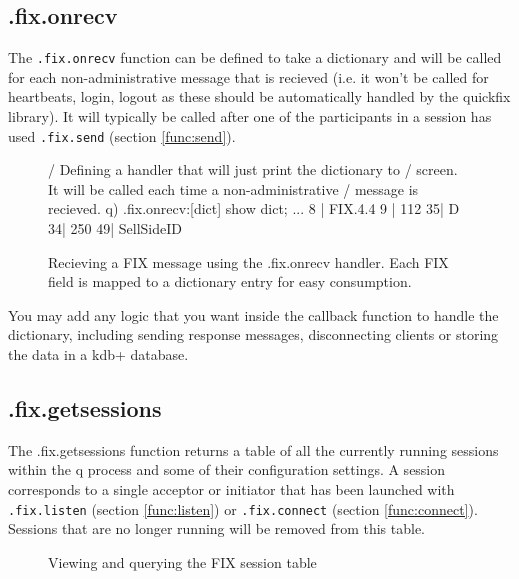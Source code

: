 \subsection{.fix.onrecv}
\label{func:onrecv}

The \texttt{.fix.onrecv} function can be defined to take a dictionary and will be called for each non-administrative message that is recieved (i.e. it won't be called for heartbeats, login, logout as these should be automatically handled by the quickfix library). It will typically be called after one of the participants in a session has used \texttt{.fix.send} (section \ref{func:send}). 

\begin{figure}[H]
\begin{qcode}
/ Defining a handler that will just print the dictionary to
/ screen. It will be called each time a non-administrative
/ message is recieved.
q) .fix.onrecv:{[dict] show dict; }
...
8 | FIX.4.4
9 | 112
35| D
34| 250
49| SellSideID
\end{qcode}
\caption{Recieving a FIX message using the .fix.onrecv handler. Each FIX field is mapped to a dictionary entry for easy consumption. }
\end{figure}

You may add any logic that you want inside the callback function to handle the dictionary, including sending response messages, disconnecting clients or storing
the data in a kdb+ database.

\subsection{.fix.getsessions}
\label{func:getsessions}

The .fix.getsessions function returns a table of all the currently running sessions within the q process and some of their configuration settings. A session corresponds
to a single acceptor or initiator that has been launched with \texttt{.fix.listen} (section \ref{func:listen}) or \texttt{.fix.connect} (section \ref{func:connect}). Sessions that are no longer
running will be removed from this table.

\begin{figure}[H]
\caption{Viewing and querying the FIX session table}
\end{figure}

